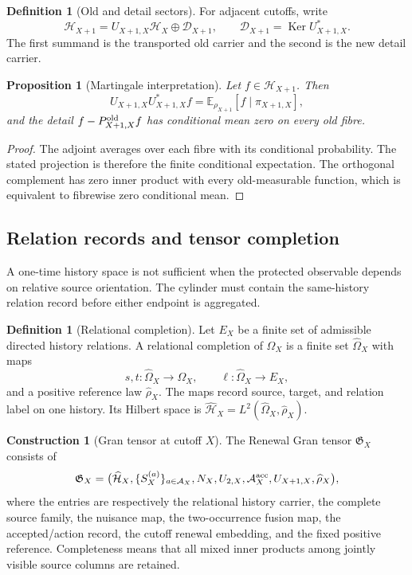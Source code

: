 \documentclass[11pt]{article}
\newtheorem{proposition}[theorem]{Proposition}
\theoremstyle{definition}
\newtheorem{definition}[theorem]{Definition}
\newtheorem{construction}[theorem]{Construction}
\theoremstyle{remark}
\newcommand{\E}{\mathbb E}
\newcommand{\Ker}{\operatorname{Ker}}
\newcommand{\Gran}{\mathfrak G}
\begin{document}
\begin{definition}[Old and detail sectors]
For adjacent cutoffs, write
\[
 \mathcal H_{X+1}
 =U_{X+1,X}\mathcal H_X\oplus\mathcal D_{X+1},
 \qquad
 \mathcal D_{X+1}=\Ker U_{X+1,X}^*.
\]
The first summand is the transported old carrier and the second is the
new detail carrier.
\end{definition}

\begin{proposition}[Martingale interpretation]
Let $f\in\mathcal H_{X+1}$.  Then
\[
 U_{X+1,X}U_{X+1,X}^*f
 =\E_{\rho_{X+1}}[f\mid\pi_{X+1,X}],
\]
and the detail $f-P^{\rm old}_{X+1,X}f$ has conditional mean zero on every
old fibre.
\end{proposition}

\begin{proof}
The adjoint averages over each fibre with its conditional probability.  The
stated projection is therefore the finite conditional expectation.  The
orthogonal complement has zero inner product with every old-measurable
function, which is equivalent to fibrewise zero conditional mean.
\end{proof}

\subsection{Relation records and tensor completion}

A one-time history space is not sufficient when the protected observable
depends on relative source orientation.  The cylinder must contain the
same-history relation record before either endpoint is aggregated.

\begin{definition}[Relational completion]
Let $E_X$ be a finite set of admissible directed history relations.  A
relational completion of $\Omega_X$ is a finite set
$\widehat\Omega_X$ with maps
\[
 s,t:\widehat\Omega_X\to\Omega_X,
 \qquad
 \ell:\widehat\Omega_X\to E_X,
\]
and a positive reference law $\widehat\rho_X$.  The maps record source,
target, and relation label on one history.  Its Hilbert space is
$\widehat{\mathcal H}_X=L^2(\widehat\Omega_X,\widehat\rho_X)$.
\end{definition}

\begin{construction}[Gran tensor at cutoff $X$]
\label{con:gran-tensor}
The Renewal Gran tensor $\Gran_X$ consists of
\[
 \Gran_X=
 \bigl(
 \widehat{\mathcal H}_X,
 \{S_X^{(a)}\}_{a\in\mathcal A_X},
 N_X,
 U_{2,X},
 \mathcal A_X^{\rm acc},
 U_{X+1,X},
 \widehat\rho_X
 \bigr),
\]
where the entries are respectively the relational history carrier, the
complete source family, the nuisance map, the two-occurrence fusion map, the
accepted/action record, the cutoff renewal embedding, and the fixed positive
reference.  Completeness means that all mixed inner products among jointly
visible source columns are retained.
\end{construction}
\end{document}
